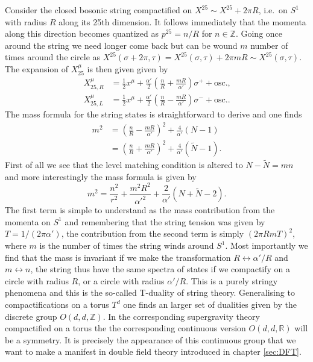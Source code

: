 Consider the closed bosonic string compactified on $X^{25}\sim X^{25}+2\pi R$, i.e.\ on $S^1$ with radius $R$ along its 25th dimension. It follows immediately that the momenta along this direction becomes quantized as $p^{25}=n/R$ for $n\in \mathbb{Z}$. Going once around the string we need longer come back but can be wound $m$ number of times around the circle as $X^{25}(\sigma+2\pi,\tau)=X^{25}(\sigma,\tau)+2\pi mR\sim X^{25}(\sigma,\tau)$. The expansion of $X_{25}^\mu$ is then given given by 
\begin{equation}
    \begin{aligned}
        X^\mu_{25,R}&=\frac{1}{2}x^\mu+\frac{\alpha'}{2}\left(\frac{n}{R}+\frac{mR}{\alpha'}\right)\sigma^++\text{osc.,}\\
        X^\mu_{25,L}&=\frac{1}{2}x^\mu+\frac{\alpha'}{2}\left(\frac{n}{R}-\frac{mR}{\alpha'}\right)\sigma^-+\text{osc.}.
    \end{aligned}
\end{equation}
The mass formula for the string states is straightforward to derive and one finds
\begin{equation}
    \begin{aligned}
    m^2 &= \left(\frac{n}{R}-\frac{mR}{\alpha'}\right)^2+\frac{4}{\alpha'}\left(N-1\right)\\
        &= \left(\frac{n}{R}+\frac{mR}{\alpha'}\right)^2+\frac{4}{\alpha'}\left(\tilde{N}-1\right).
    \end{aligned}
\end{equation}
First of all we see that the level matching condition is altered to $N-\tilde{N}=mn$ and more interestingly the mass formula is given by 
\begin{equation}
    m^2 = \frac{n^2}{r^2}+\frac{m^2R^2}{\alpha'^2}+\frac{2}{\alpha'}(N+\tilde{N}-2).
\end{equation}
The first term is simple to understand as the mass contribution from the momenta on $S^1$ and remembering that the string tension was given by $T=1/(2\pi\alpha')$, the contribution from the second term is simply $(2\pi RmT)^2$, where $m$ is the number of times the string winds around $S^1$. Most importantly we find that the mass is invariant if we make the transformation $R\leftrightarrow\alpha'/R$ and $m\leftrightarrow n$, the string thus have the same spectra of states if we compactify on a circle with radius $R$, or a circle with radius $\alpha'/R$. This is a purely stringy phenomena and this is the so-called T-duality of string theory. Generalising to compactifications on a torus $T^d$ one finds an larger set of dualities given by the discrete group $O(d,d,\mathbb{Z})$. In the corresponding supergravity theory compactified on a torus the the corresponding continuous version $O(d,d,\mathbb{R})$ will be a symmetry. It is precisely the appearance of this continuous group that we want to make a manifest in double field theory introduced in chapter \ref{sec:DFT}.

